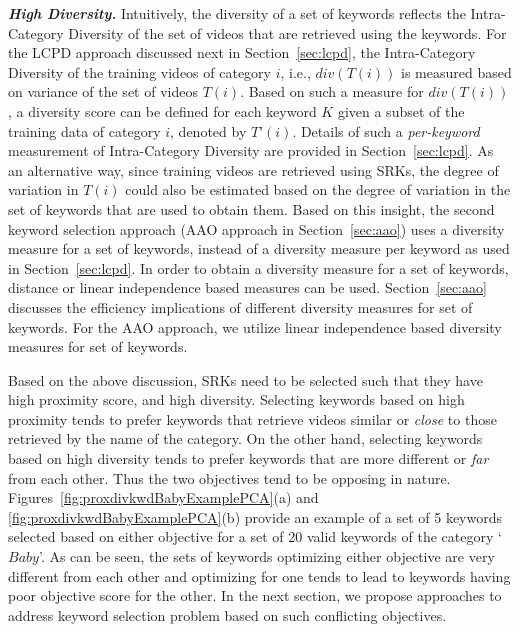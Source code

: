 \textbf{\textit{High Diversity.}} Intuitively, the diversity of a set of keywords reflects the Intra-Category Diversity of the set of videos that are retrieved using the keywords. For the LCPD approach discussed next in Section~\ref{sec:lcpd}, the Intra-Category Diversity of the training videos of category $i$, i.e., $div(T(i))$ is measured based on variance of the set of videos $T(i)$. Based on such a measure for $div(T(i))$, a diversity score can be defined for each keyword $K$ given a subset of the training data of category $i$, denoted by $T\text{'}(i)$. Details of such a \textit{per-keyword} measurement of Intra-Category Diversity are provided in Section~\ref{sec:lcpd}. As an alternative way, since training videos are retrieved using SRKs, the degree of variation in $T(i)$ could also be estimated based on the degree of variation in the set of keywords that are used to obtain them. Based on this insight, the second keyword selection approach (AAO approach in Section~\ref{sec:aao}) uses a diversity measure for a set of keywords, instead of a diversity measure per keyword as used in Section~\ref{sec:lcpd}. In order to obtain a diversity measure for a set of keywords, distance or linear independence based measures can be used. Section~\ref{sec:aao} discusses the efficiency implications of different diversity measures for set of keywords. For the AAO approach, we utilize linear independence based diversity measures for set of keywords. 

Based on the above discussion, SRKs need to be selected such that they have high proximity score, and high diversity. Selecting keywords based on high proximity tends to prefer keywords that retrieve videos similar or \textit{close} to those retrieved by the name of the category. On the other hand, selecting keywords based on high diversity tends to prefer keywords that are more different or \textit{far} from each other. Thus the two objectives tend to be opposing in nature. Figures~\ref{fig:proxdivkwdBabyExamplePCA}(a) and \ref{fig:proxdivkwdBabyExamplePCA}(b) provide an example of a set of 5 keywords selected based on either objective for a set of 20 valid keywords of the category `$Baby$'. As can be seen, the sets of keywords optimizing either objective are very different from each other and optimizing for one tends to lead to keywords having poor objective score for the other. In the next section, we propose approaches to address keyword selection problem based on such conflicting objectives. 

